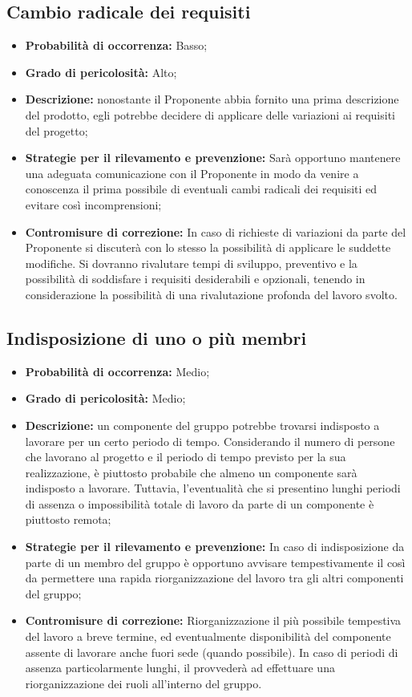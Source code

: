 \subsection{Cambio radicale dei requisiti}
\begin{itemize}
\item \textbf{Probabilità di occorrenza:} Basso;
\item \textbf{Grado di pericolosità:} Alto;
\item \textbf{Descrizione:} nonostante il Proponente abbia fornito una prima descrizione del prodotto, egli potrebbe decidere di applicare delle variazioni ai requisiti del progetto;
\item \textbf{Strategie per il rilevamento e prevenzione:} Sarà opportuno mantenere una adeguata comunicazione con il Proponente in modo da venire a conoscenza il prima possibile di eventuali cambi radicali dei requisiti ed evitare così incomprensioni;
\item \textbf{Contromisure di correzione:} In caso di richieste di variazioni da parte del Proponente si discuterà con lo stesso la possibilità di applicare le suddette modifiche. Si dovranno rivalutare tempi di sviluppo, preventivo e la possibilità di soddisfare i requisiti desiderabili e opzionali, tenendo in considerazione la possibilità di una rivalutazione profonda del lavoro svolto.
\end{itemize}

\subsection{Indisposizione di uno o più membri}
\begin{itemize}
\item \textbf{Probabilità di occorrenza:} Medio;
\item \textbf{Grado di pericolosità:} Medio;
\item \textbf{Descrizione:} un componente del gruppo potrebbe trovarsi indisposto a lavorare per un certo periodo di tempo. Considerando il numero di persone che lavorano al progetto  e il periodo di tempo previsto per la sua realizzazione, è piuttosto probabile che almeno un componente sarà indisposto a lavorare. Tuttavia, l'eventualità che si presentino lunghi periodi di assenza o impossibilità totale di lavoro da parte di un componente è piuttosto remota;
\item \textbf{Strategie per il rilevamento e prevenzione:} In caso di indisposizione da parte di un membro del gruppo è opportuno avvisare tempestivamente il \ruoloResponsabile  così da permettere una rapida riorganizzazione del lavoro tra gli altri componenti del gruppo;
\item \textbf{Contromisure di correzione:} Riorganizzazione il più possibile tempestiva del lavoro a breve termine, ed eventualmente disponibilità del componente assente di lavorare anche fuori sede (quando possibile). In caso di periodi di assenza particolarmente lunghi, il \ruoloResponsabile provvederà ad effettuare una riorganizzazione dei ruoli all'interno del gruppo.
\end{itemize}

